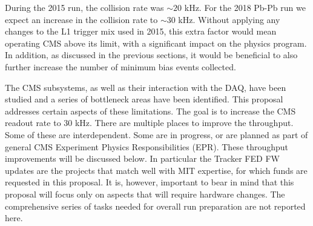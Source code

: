 During the 2015 run, the collision rate was $\sim 20$ kHz. For the 2018 Pb-Pb run we expect an increase in the collision rate to $\sim 30$ kHz. Without applying any changes to the L1 trigger mix used in 2015, this extra factor would mean operating CMS above its limit, with a significant impact on the physics program. In addition, as discussed in the previous sections, it would be beneficial to also further increase the number of minimum bias events collected. 

The CMS subsystems, as well as their interaction with the DAQ, have been studied and a series of bottleneck areas have been identified. This proposal addresses certain aspects of these limitations. The goal is to increase the CMS readout rate to 30 kHz. There are multiple places to improve the throughput. Some of these are interdependent.  Some are in progress, or are planned as part of general CMS Experiment Physics Responsibilities (EPR). These throughput improvements will be discussed below. In particular the Tracker FED FW 
updates are the projects that match well with MIT expertise, for which funds are requested in this proposal.
It is, however, important to bear in mind that this proposal will focus only on aspects that will require hardware changes. The comprehensive series of tasks needed for overall run preparation are not reported here. 

